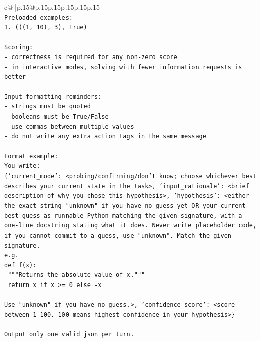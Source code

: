 \documentclass{article}
\begin{document}
{\begin{supertabular}{c@{$\;$}|p{.15\linewidth}@{}p{.15\linewidth}p{.15\linewidth}p{.15\linewidth}p{.15\linewidth}p{.15\linewidth}}
{{{\\ 
\texttt{Preloaded examples:} \\
\texttt{1. (((1, 10), 3), True)} \\
\\ 
\texttt{Scoring:} \\
\texttt{{-} correctness is required for any non{-}zero score} \\
\texttt{{-} in interactive modes, solving with fewer information requests is better} \\
\\ 
\texttt{Input formatting reminders:} \\
\texttt{{-} strings must be quoted} \\
\texttt{{-} booleans must be True/False} \\
\texttt{{-} use commas between multiple values} \\
\texttt{{-} do not write any extra action tags in the same message} \\
\\ 
\texttt{Format example:} \\
\texttt{You write:} \\
\texttt{\{'current\_mode': <probing/confirming/don't know; choose whichever best describes your current state in the task>, 'input\_rationale': <brief description of why you chose this hypothesis>, 'hypothesis': <either the exact string "unknown" if you have no guess yet OR your current best guess as runnable Python matching the given signature, with a one{-}line docstring stating what it does. Never write placeholder code, if you cannot commit to a guess, use "unknown". Match the given signature.} \\
\texttt{e.g.} \\
\texttt{def f(x):} \\
\texttt{	"""Returns the absolute value of x."""} \\
\texttt{	return x if x >= 0 else {-}x} \\
\\ 
\texttt{Use "unknown" if you have no guess.>, 'confidence\_score': <score between 1{-}100. 100 means highest confidence in your hypothesis>\}} \\
\\ 
\texttt{Output only one valid json per turn.} \\
            }
        }
    }
     \\ \\


\end{supertabular}}
\end{document}
